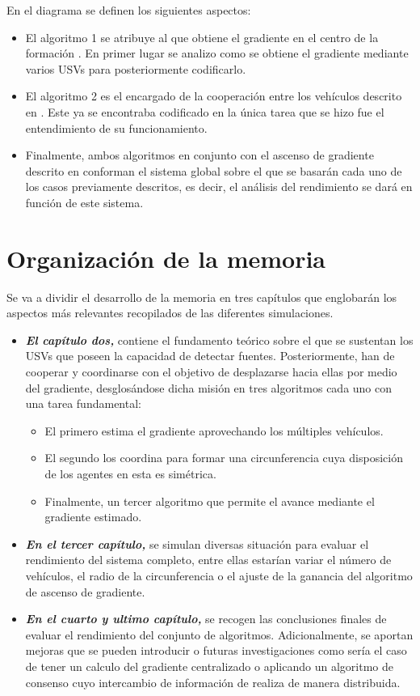 En el diagrama se definen los siguientes aspectos:

\begin{itemize}
	\item El algoritmo 1 se atribuye al que obtiene el gradiente en el centro de la formación \cite{Estimacion_Gradiente}. En primer lugar se analizo como se obtiene el gradiente mediante varios USVs para posteriormente codificarlo.
	\item El algoritmo 2 es el encargado de la cooperación entre los vehículos descrito en \cite{Control_Formacion}. Este ya se encontraba codificado en \cite{Git_Hector} la única tarea que se hizo fue el entendimiento de su funcionamiento.
	\item Finalmente, ambos algoritmos en conjunto con el ascenso de gradiente descrito en \cite{Adicional_Estimacion_1} conforman el sistema global sobre el que se basarán cada uno de los casos previamente descritos, es decir, el análisis del rendimiento se dará en función de este sistema.
\end{itemize}

\section{Organización de la memoria}

Se va a dividir el desarrollo de la memoria en tres capítulos que englobarán los aspectos más relevantes recopilados de las diferentes simulaciones.

\begin{itemize}
	\item \textbf{\emph{El capítulo dos,}} contiene el fundamento teórico sobre el que se sustentan los USVs que poseen la capacidad de detectar fuentes. Posteriormente, han de cooperar y coordinarse con el objetivo de desplazarse hacia ellas por medio del gradiente, desglosándose dicha misión en tres algoritmos cada uno con una tarea fundamental: 
	\begin{itemize}
		\item El primero estima el gradiente aprovechando los múltiples vehículos.
		\item El segundo los coordina para formar una circunferencia cuya disposición de los agentes en esta es simétrica.
		\item Finalmente, un tercer algoritmo que permite el avance mediante el gradiente estimado.
	\end{itemize}
	\item  \textbf{\emph{En el tercer capítulo,}} se simulan diversas situación para evaluar el rendimiento del sistema completo, entre ellas estarían variar el número de vehículos, el radio de la circunferencia o el ajuste de la ganancia del algoritmo de ascenso de gradiente.
	\item \textbf{\emph{En el cuarto y ultimo capítulo,}} se recogen las conclusiones finales de evaluar el rendimiento del conjunto de algoritmos. Adicionalmente, se aportan mejoras que se pueden introducir o futuras investigaciones como sería el caso de tener un calculo del gradiente centralizado o aplicando un algoritmo de consenso cuyo intercambio de información de realiza de manera distribuida.
\end{itemize}
 